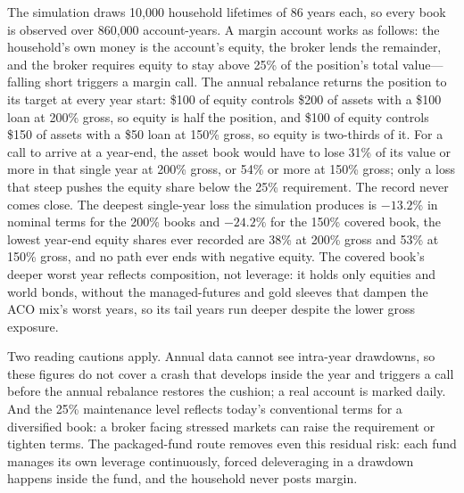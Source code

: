 \documentclass[11pt]{article}
\begin{document}
The simulation draws 10{,}000 household lifetimes of 86 years each, so every
book is observed over 860{,}000 account-years. A margin account works as
follows: the household's own money is the account's equity, the broker lends
the remainder, and the broker requires equity to stay above 25\% of the
position's total value---falling short triggers a margin call. The annual
rebalance returns the position to its target at every year start: \$100 of
equity controls \$200 of assets with a \$100 loan at 200\% gross, so equity is
half the position, and \$100 of equity controls \$150 of assets with a \$50
loan at 150\% gross, so equity is two-thirds of it. For a call to arrive at a
year-end, the asset book would have to lose 31\% of its value or more in that
single year at 200\% gross, or 54\% or more at 150\% gross; only a loss that
steep pushes the equity share below the 25\% requirement. The record never
comes close. The deepest single-year loss the simulation produces is $-13.2\%$
in nominal terms for the 200\% books and $-24.2\%$ for the 150\% covered book,
the lowest year-end equity shares ever recorded are 38\% at 200\% gross and
53\% at 150\% gross, and no path ever ends with negative equity. The covered
book's deeper worst year reflects composition, not leverage: it holds only
equities and world bonds, without the managed-futures and gold sleeves that
dampen the ACO mix's worst years, so its tail years run deeper despite the
lower gross exposure.

Two reading cautions apply. Annual data cannot see intra-year drawdowns, so
these figures do not cover a crash that develops inside the year and triggers
a call before the annual rebalance restores the cushion; a real account is
marked daily. And the 25\% maintenance level reflects today's conventional
terms for a diversified book: a broker facing stressed markets can raise the
requirement or tighten terms. The packaged-fund route removes even this
residual risk: each fund manages its own leverage continuously, forced
deleveraging in a drawdown happens inside the fund, and the household never
posts margin.
\end{document}
